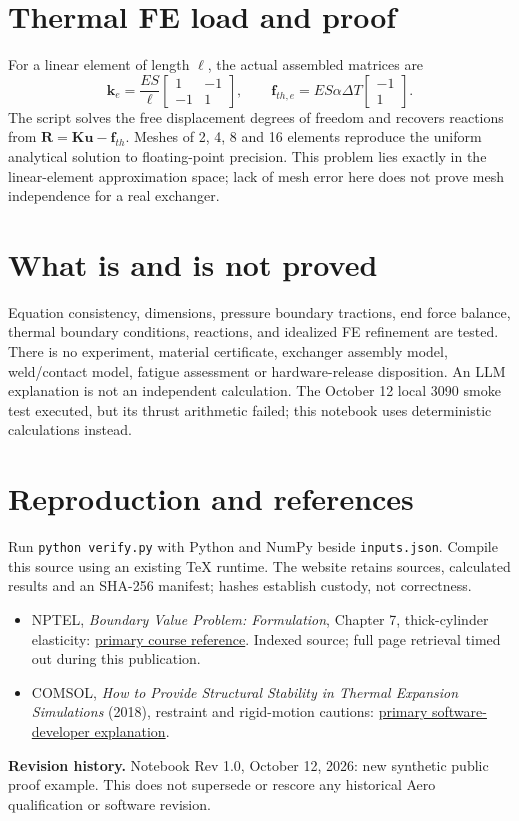 \documentclass[11pt]{article}
\begin{document}
\section{Thermal FE load and proof}
For a linear element of length $\ell$, the actual assembled matrices are
\begin{equation}
\mathbf k_e=\frac{ES}{\ell}\begin{bmatrix}1&-1\\-1&1\end{bmatrix},
\qquad \mathbf f_{th,e}=ES\alpha\Delta T\begin{bmatrix}-1\\1\end{bmatrix}.
\end{equation}
The script solves the free displacement degrees of freedom and recovers reactions from $\mathbf R=\mathbf K\mathbf u-\mathbf f_{th}$. Meshes of 2, 4, 8 and 16 elements reproduce the uniform analytical solution to floating-point precision. This problem lies exactly in the linear-element approximation space; lack of mesh error here does not prove mesh independence for a real exchanger.
\section{What is and is not proved}
Equation consistency, dimensions, pressure boundary tractions, end force balance, thermal boundary conditions, reactions, and idealized FE refinement are tested. There is no experiment, material certificate, exchanger assembly model, weld/contact model, fatigue assessment or hardware-release disposition. An LLM explanation is not an independent calculation. The October 12 local 3090 smoke test executed, but its thrust arithmetic failed; this notebook uses deterministic calculations instead.
\section{Reproduction and references}
Run \texttt{python verify.py} with Python and NumPy beside \texttt{inputs.json}. Compile this source using an existing TeX runtime. The website retains sources, calculated results and an SHA-256 manifest; hashes establish custody, not correctness.
\begin{itemize}
\item NPTEL, \emph{Boundary Value Problem: Formulation}, Chapter 7, thick-cylinder elasticity: \href{https://archive.nptel.ac.in/content/storage2/courses/105106049/lecnotes/mainch7.html}{primary course reference}. Indexed source; full page retrieval timed out during this publication.
\item COMSOL, \emph{How to Provide Structural Stability in Thermal Expansion Simulations} (2018), restraint and rigid-motion cautions: \href{https://www.comsol.com/blogs/how-to-provide-structural-stability-in-thermal-expansion-simulations}{primary software-developer explanation}.
\end{itemize}
\noindent\textbf{Revision history.} Notebook Rev 1.0, October 12, 2026: new synthetic public proof example. This does not supersede or rescore any historical Aero qualification or software revision.
\end{document}
